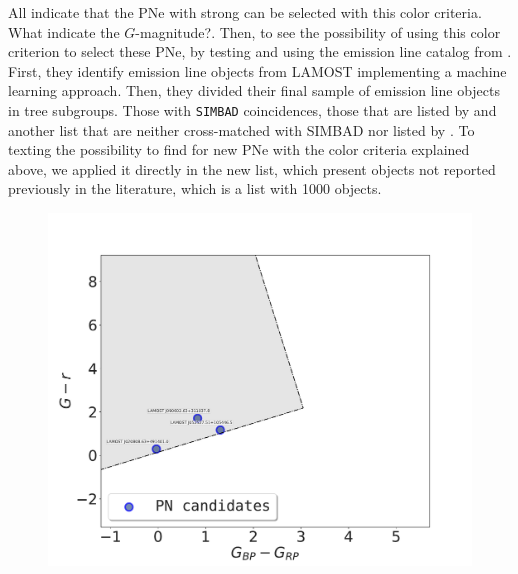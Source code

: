\documentclass[fleqn,usenatbib]{mnras}
\begin{document}
All indicate that the PNe with strong \ha{} can be selected with this color
criteria. {\sc What indicate the $G$-magnitude?.}
Then, to see the possibility of using this color criterion to select these PNe, by
testing and using the emission line catalog from  \citet{Skoda:2020}. First, they
identify emission line objects from LAMOST  implementing a machine learning approach.
Then, they divided their final sample of emission line objects in tree subgroups.
Those with \texttt{SIMBAD} coincidences, those that are listed by \citet{Hou:2016}
and another list that are neither cross-matched with
SIMBAD nor listed by  \citet{Hou:2016}. To texting the possibility to find
for new PNe with the color criteria explained above, we applied it directly in the new list,
which present objects not reported previously in the literature, which is a list with
1000 objects.

\begin{figure}
\centering
  \includegraphics[width=0.9\linewidth]{Figs/pn-candidates-gaiaDR3.pdf}
  \caption{} 
  \label{fig:gaia-ps-apply}
\end{figure}
\end{document}
